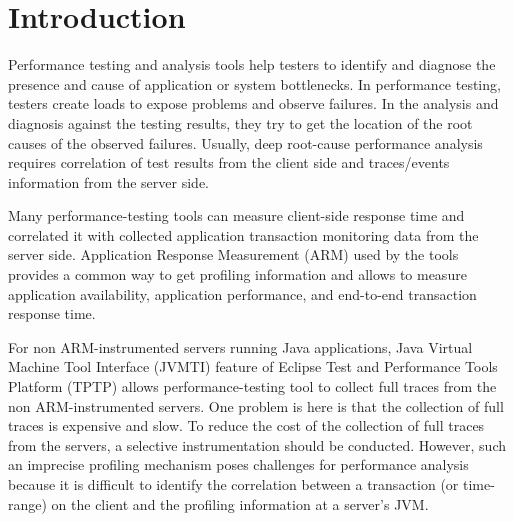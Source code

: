 \section{Introduction}
\label{sec:introduction}


Performance testing and analysis tools help testers to identify and diagnose the presence and cause of application or system bottlenecks. 
In performance testing, testers create loads to expose problems and observe failures. 
In the analysis and diagnosis against the testing results, they try to get the location of the root causes of the observed failures. 
Usually, deep root-cause performance analysis requires correlation of test results from the client side and traces/events information from the server side.

Many performance-testing tools \cite{RPT} \cite{LoadRunner} can measure client-side response time and correlated it with collected application transaction monitoring data from the server side. Application Response Measurement (ARM) \cite{ARM} used by the tools provides a common way to get profiling information and allows to measure application availability, application performance, and end-to-end transaction response time.

For non ARM-instrumented servers running Java applications, 
Java Virtual Machine Tool Interface (JVMTI) \cite{JVMTI} feature of Eclipse Test and Performance Tools Platform (TPTP) \cite{TPTP} allows performance-testing tool to collect full traces from the non ARM-instrumented servers. One problem is here is that the collection of full traces is expensive and slow. To reduce the cost of the collection of full traces from the servers, a selective instrumentation should be conducted. However, such an imprecise profiling mechanism poses challenges for performance analysis because it is difficult to identify the correlation between a transaction (or time-range) on the client and the profiling information at a server's JVM.

